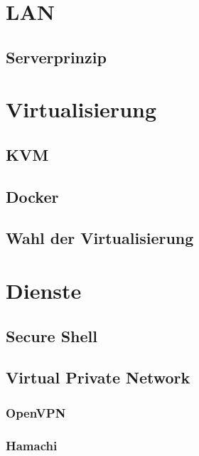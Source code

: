 \section{LAN}
\subsection{Serverprinzip}

\section{Virtualisierung}
\subsection{KVM}

\subsection{Docker}

\subsection{Wahl der Virtualisierung}

\section{Dienste}
\subsection{Secure Shell}

\subsection{Virtual Private Network}
\subsubsection{OpenVPN}

\subsubsection{Hamachi}


